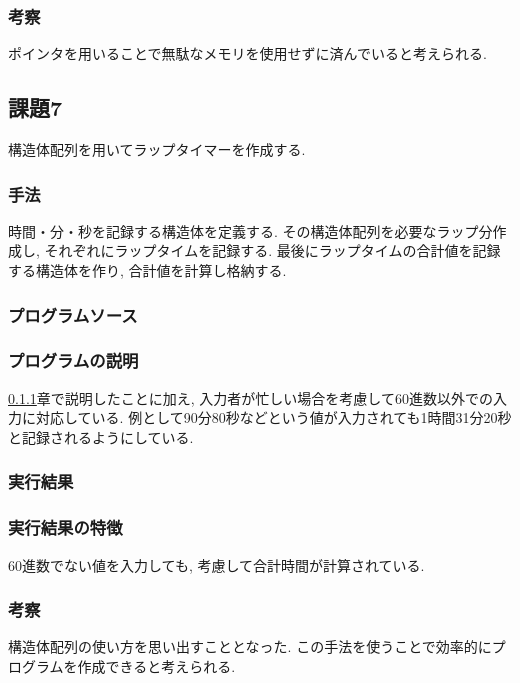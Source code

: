 \documentclass{jsarticle}
\begin{document}
            \subsubsection{考察}
                ポインタを用いることで無駄なメモリを使用せずに済んでいると考えられる. 
        
        \subsection{課題7}
            \label{kadai7}
            構造体配列を用いてラップタイマーを作成する. 
            \subsubsection{手法}
                \label{syuho}
                時間・分・秒を記録する構造体を定義する. 
                その構造体配列を必要なラップ分作成し, それぞれにラップタイムを記録する. 
                最後にラップタイムの合計値を記録する構造体を作り, 合計値を計算し格納する. 
            \subsubsection{プログラムソース}
                
            \subsubsection{プログラムの説明}
                \ref{syuho}章で説明したことに加え, 入力者が忙しい場合を考慮して60進数以外での入力に対応している. 
                例として90分80秒などという値が入力されても1時間31分20秒と記録されるようにしている. 
            \subsubsection{実行結果}
                

            \subsubsection{実行結果の特徴}
                60進数でない値を入力しても, 考慮して合計時間が計算されている. 
            
            \subsubsection{考察}
                構造体配列の使い方を思い出すこととなった. この手法を使うことで効率的にプログラムを作成できると考えられる. 
                
\end{document}
